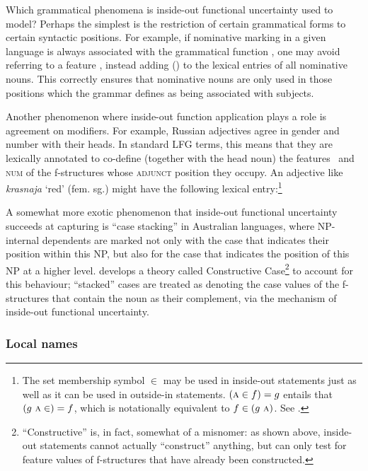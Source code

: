 \documentclass[output=paper,hidelinks]{langscibook}
\begin{document}
  Which grammatical phenomena is inside-out functional uncertainty used to model? Perhaps the simplest is the restriction of certain grammatical forms to certain syntactic positions. For example, if nominative marking in a given language is always associated with the grammatical function \SUBJ, one may avoid referring to a feature \CASE, instead adding (\SUBJ\UP) to the lexical entries of all nominative nouns. This correctly ensures that nominative nouns are only used in those positions which the grammar defines as being associated with subjects. 
  
  Another phenomenon where inside-out function application plays a role is agreement on modifiers. For example, Russian adjectives agree in gender and number with their heads. In standard LFG terms, this means that they are lexically annotated to co-define (together with the head noun) the features \CASE\ and \textsc{num} of the f-structures whose \textsc{adjunct} position they occupy. An adjective like \textit{krasnaja} `red' (fem. sg.) might have the following lexical entry:\footnote{The set membership symbol $\in$ may be used in inside-out statements just as well as it can be used in outside-in statements. $(\textsc{a} \in f) = g$ entails that $(g~\textsc{a} \in) = f$, which is notationally equivalent to $f \in (g~\textsc{a})$. See .}
  
  \ea
  \z
  
  A somewhat more exotic phenomenon that inside-out functional uncertainty succeeds at capturing is ``case stacking'' in Australian languages, where NP-in\-ter\-nal dependents are marked not only with the case that indicates their position within this NP, but also for the case that indicates the position of this NP at a higher level. \textcite{nordlinger1998constructive} develops a theory called Constructive Case\footnote{``Constructive'' is, in fact, somewhat of a misnomer: as shown above, inside-out statements cannot actually ``construct'' anything, but can only test for feature values of f-structures that have already been constructed.} to account for this behaviour; ``stacked'' cases are treated as denoting the case values of the f-structures that contain the noun as their complement, via the mechanism of inside-out functional uncertainty.
 
 \subsubsection{Local names}\label{sec:CoreConcepts:localname}
\end{document}
